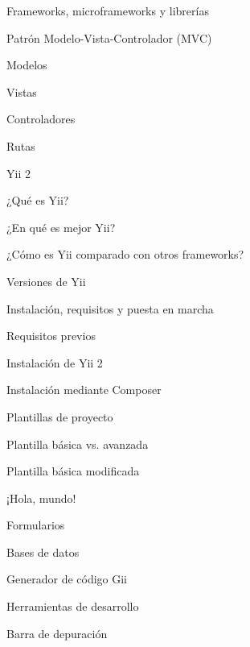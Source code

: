 \begin{longenum}
\begin{longenum}
        \item Frameworks, microframeworks y librerías
        \item Patrón Modelo-Vista-Controlador (MVC)
        \begin{longenum}
            \item Modelos
            \item Vistas
            \item Controladores
            \item Rutas
        \end{longenum}
        \item Yii 2
        \begin{longenum}
            \item ¿Qué es Yii?
            \item ¿En qué es mejor Yii?
            \item ¿Cómo es Yii comparado con otros frameworks?
            \item Versiones de Yii
        \end{longenum}
        \item Instalación, requisitos y puesta en marcha
        \begin{longenum}
            \item Requisitos previos
            \item Instalación de Yii 2
            \begin{longenum}
                \item Instalación mediante Composer
            \end{longenum}
            \item Plantillas de proyecto
            \begin{longenum}
                \item Plantilla básica vs. avanzada
                \item Plantilla básica modificada
            \end{longenum}
        \end{longenum}
        \item ¡Hola, mundo!
        \item Formularios
        \item Bases de datos
        \item Generador de código Gii
        \item Herramientas de desarrollo
        \begin{longenum}
            \item Barra de depuración

\end{longenum}
\end{longenum}
\end{longenum}
